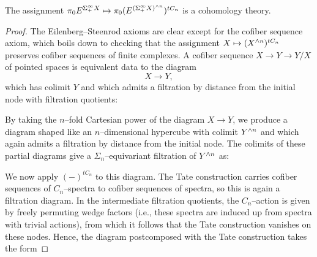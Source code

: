 \begin{lemma}\label{TateConstructionIsACohomThy}
The assignment $\pi_0 E^{\Sigma^\infty_+ X} \mapsto \pi_0 (E^{(\Sigma^\infty_+ X)^{\wedge n}})^{tC_n}$ is a cohomology theory.
\end{lemma}
\begin{proof}
The Eilenberg--Steenrod axioms are clear except for the cofiber sequence axiom, which boils down to checking that the assignment $X \mapsto (X^{\wedge n})^{tC_n}$ preserves cofiber sequences of finite complexes.  A cofiber sequence $X \to Y \to Y/X$ of pointed spaces is equivalent data to the diagram \[X \to Y,\] which has colimit $Y$ and which admits a filtration by distance from the initial node with filtration quotients:
\begin{center}
\end{center}
By taking the $n$--fold Cartesian power of the diagram $X \to Y$, we produce a diagram shaped like an $n$--dimensional hypercube with colimit $Y^{\wedge n}$ and which again admits a filtration by distance from the initial node.  The colimits of these partial diagrams give a $\Sigma_n$--equivariant filtration of $Y^{\wedge n}$ as:
\begin{center}
\end{center}
We now apply $(-)^{tC_n}$ to this diagram.  The Tate construction carries cofiber sequences of $C_n$--spectra to cofiber sequences of spectra, so this is again a filtration diagram.  In the intermediate filtration quotients, the $C_n$--action is given by freely permuting wedge factors (i.e., these spectra are induced up from spectra with trivial actions), from which it follows that the Tate construction vanishes on these nodes.  Hence, the diagram postcomposed with the Tate construction takes the form

\end{proof}
